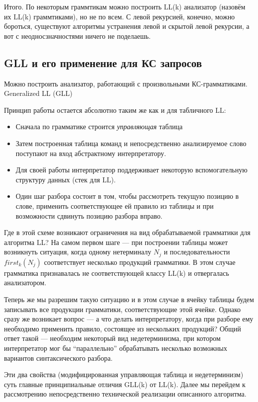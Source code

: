 Итого. По некоторым граммтикам можно построить LL(k) анализатор (назовём их LL(k) граммтиками), но не по всем.
С левой рекурсией, конечно, можно бороться, существуют алгоритмы устранения левой и скрытой левой рекурсии, а вот с неодносзначностями ничего не поделаешь.



\subsection{GLL и его применение для КС запросов}

Можно построить анализатор, работающий с произвольными КС-грамматиками.
Generalized LL (GLL)~\cite{Scott:2010:GP:1860132.1860320,10.1007/978-3-662-46663-6_5}

Принцип работы остается абсолютно таким же как и для табличного LL: 
\begin{itemize}
  \item Сначала по грамматике строится \textit{управляющая} таблица
  \item Затем построенная таблица команд и непосредственно анализируемое слово поступают на вход абстрактному интерпретатору.
  \item Для своей работы интерпретатор поддерживает некоторую вспомогательную структуру данных (стек для LL).
  \item Один шаг разбора состоит в том, чтобы рассмотреть текущую позицию в слове, применить соответствующее ей правило из таблицы и при возможности сдвинуть позицию разбора вправо.
\end{itemize}

Где в этой схеме возникают ограничения на вид обрабатываемой грамматики для алгоритма LL? На самом первом шаге --- при построении таблицы может возникнуть ситуация, когда одному нетерминалу $N_j$ и последовательности $first_k(N_j)$ соответствует несколько продукций грамматики. В этом случае грамматика признавалась не соответствующей классу LL(k) и отвергалась анализатором.

Теперь же мы разрешим такую ситуацию и в этом случае в ячейку таблицы будем записывать все продукции грамматики, соответствующие этой ячейке. Однако сразу же возникает вопрос --- а что делать интерпретатору, когда при разборе ему необходимо применить правило, состоящее из нескольких продукций? Общий ответ такой --- необходим некоторый вид недетерминизма, при котором интерпретатор мог бы ``параллельно'' обрабатывать несколько возможных вариантов синтаксического разбора.

Эти два свойства (модифицированная управляющая таблица и недетерминизм) суть главные принципиальные отличия GLL(k) от LL(k). Далее мы перейдем к рассмотрению непосредственно технической реализации описанного алгоритма.


